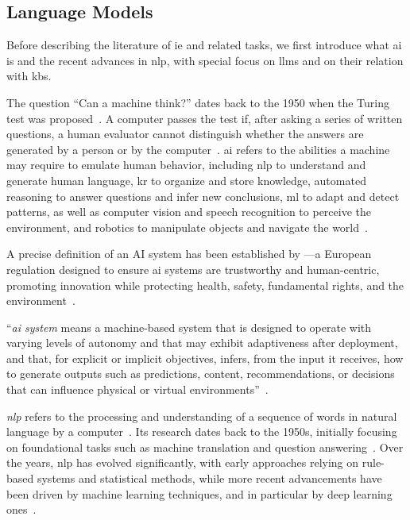 \subsection{Language Models}
Before describing the literature of \ac{ie} and related tasks, we first introduce what \acl{ai} is and the recent advances in \ac{nlp}, with special focus on \acp{llm} and on their relation with \acp{kb}.

The question ``Can a machine think?'' dates back to the 1950 when the Turing test was proposed~\cite{turing1950computing}. A computer passes the test if, after asking a series of written questions, a human evaluator cannot distinguish whether the answers are generated by a person or by the computer~\cite{}.
\Acf{ai} refers to the abilities a machine may require to emulate human behavior, including \acl{nlp} to understand and generate human language, \acl{kr} to organize and store knowledge, automated reasoning to answer questions and infer new conclusions, \acl{ml} to adapt and detect patterns, as well as computer vision and speech recognition to perceive the environment, and robotics to manipulate objects and navigate the world~\cite{russell2020artificial}.

A precise definition of an AI system has been established by \textcite{ai_act}---a European regulation designed to ensure \acl{ai} systems are trustworthy and human-centric, promoting innovation while protecting health, safety, fundamental rights, and the environment~\cite[Article 1]{ai_act}.

\begin{definition}
``\emph{\acs{ai} system} means a machine-based system that is designed to operate with varying levels of autonomy and that may exhibit adaptiveness after deployment, and that, for explicit or implicit objectives, infers, from the input it receives, how to generate outputs such as predictions, content, recommendations, or decisions that can influence physical or virtual environments''~\cite[Article 3]{ai_act}.
\end{definition}


\emph{\Acf{nlp}} refers to the processing and understanding of a sequence of words in natural language by a computer~\cite{bates1995models}.
Its research dates back to the 1950s, initially focusing on foundational tasks such as machine translation and question answering~\cite{bates1995models}.
Over the years, \ac{nlp} has evolved significantly, with early approaches relying on rule-based systems and statistical methods, while more recent advancements have been driven by machine learning techniques, and in particular by deep learning ones~\cite{entityorientedsearch2018balog}.

